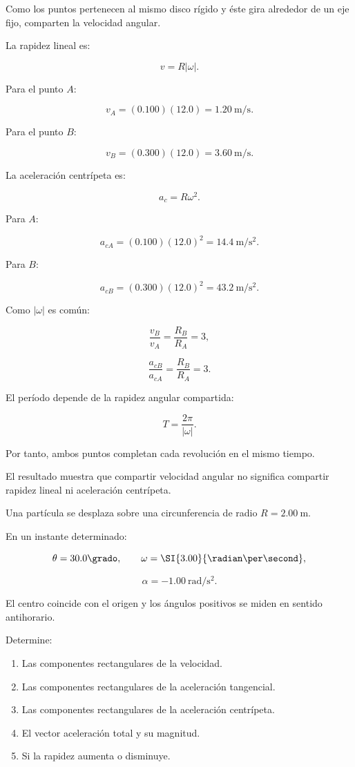 \begin{explicacion}
Como los puntos pertenecen al mismo disco rígido y éste gira
alrededor de un eje fijo, comparten la velocidad angular.

La rapidez lineal es:

\[
v=R|\omega|.
\]

Para el punto \(A\):

\[
v_A=(0.100)(12.0)
=\boxed{\SI{1.20}{\meter\per\second}}.
\]

Para el punto \(B\):

\[
v_B=(0.300)(12.0)
=\boxed{\SI{3.60}{\meter\per\second}}.
\]

La aceleración centrípeta es:

\[
a_c=R\omega^2.
\]

Para \(A\):

\[
a_{cA}=(0.100)(12.0)^2
=\boxed{\SI{14.4}{\meter\per\second\squared}}.
\]

Para \(B\):

\[
a_{cB}=(0.300)(12.0)^2
=\boxed{\SI{43.2}{\meter\per\second\squared}}.
\]

Como \(|\omega|\) es común:

\[
\frac{v_B}{v_A}=\frac{R_B}{R_A}=3,
\]

\[
\frac{a_{cB}}{a_{cA}}=\frac{R_B}{R_A}=3.
\]

El período depende de la rapidez angular compartida:

\[
T=\frac{2\pi}{|\omega|}.
\]

Por tanto, ambos puntos completan cada revolución en el
mismo tiempo.

El resultado muestra que compartir velocidad angular no
significa compartir rapidez lineal ni aceleración centrípeta.
\end{explicacion}


\begin{ejercicio}
Una partícula se desplaza sobre una circunferencia de radio
\(R=\SI{2.00}{\meter}\).

En un instante determinado:

\[
\theta=30.0\grado,
\qquad
\omega=\SI{3.00}{\radian\per\second},
\]

\[
\alpha=-\SI{1.00}{\radian\per\second\squared}.
\]

El centro coincide con el origen y los ángulos positivos se
miden en sentido antihorario.

Determine:

\begin{enumerate}[label=\alph*)]
    \item Las componentes rectangulares de la velocidad.
    \item Las componentes rectangulares de la aceleración tangencial.
    \item Las componentes rectangulares de la aceleración centrípeta.
    \item El vector aceleración total y su magnitud.
    \item Si la rapidez aumenta o disminuye.
\end{enumerate}
\end{ejercicio}

